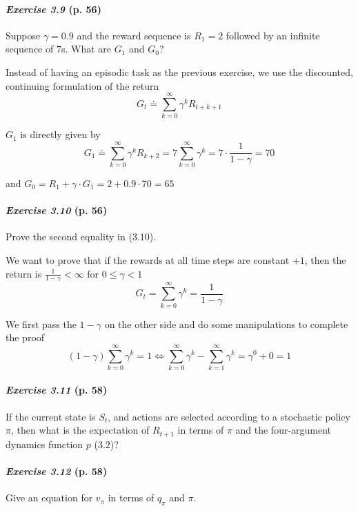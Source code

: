 \documentclass[10pt,a4paper]{article}
\begin{document}
\paragraph{\textit{Exercise 3.9} (p. 56)} Suppose $\gamma = 0.9$ and the reward sequence is $R_1 = 2$ followed by an infinite sequence of $7$s. What are $G_1$ and $G_0$?

\bigskip
Instead of having an episodic task as the previous exercise, we use the discounted, continuing formulation of the return
\begin{equation}
G_t \doteq \sum_{k=0}^\infty \gamma^k R_{t+k+1}
\end{equation}

$G_1$ is directly given by
\begin{equation}
G_1 \doteq \sum_{k=0}^\infty \gamma^k R_{k+2} = 7 \sum_{k=0}^\infty \gamma^k = 7 \cdot \frac{1}{1-\gamma} = 70
\end{equation}

and $G_0 = R_1 + \gamma \cdot G_1 = 2 + 0.9 \cdot 70 = 65$

\paragraph{\textit{Exercise 3.10} (p. 56)} Prove the second equality in ($3.10$).

\bigskip
We want to prove that if the rewards at all time steps are constant $+1$, then the return is $\frac{1}{1-\gamma} < \infty$ for $0 \leq \gamma < 1$
\begin{equation}
G_t =\sum_{k=0}^\infty \gamma^k = \frac{1}{1-\gamma}
\end{equation}

We first pass the $1-\gamma$ on the other side and do some manipulations to complete the proof
\begin{equation}
(1-\gamma) \sum_{k=0}^\infty \gamma^k = 1 \iff \sum_{k=0}^\infty \gamma^k - \sum_{k=1}^\infty \gamma^{k} = \gamma^0 + 0 = 1
\end{equation}

\paragraph{\textit{Exercise 3.11} (p. 58)} If the current state is $S_t$, and actions are selected according to a stochastic
policy $\pi$, then what is the expectation of $R_{t+1}$ in terms of $\pi$ and the four-argument dynamics function $p$ ($3.2$)?

\paragraph{\textit{Exercise 3.12} (p. 58)} Give an equation for $v_\pi$ in terms of $q_\pi$ and $\pi$.
\end{document}

